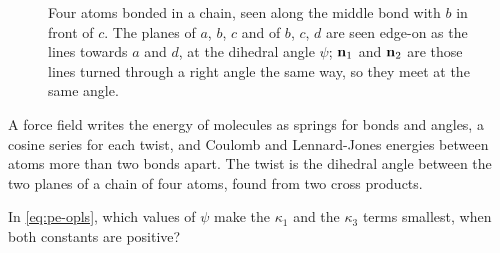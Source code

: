 \begin{figure}[htb]
\centering
{}
\caption{Four atoms bonded in a chain, seen along the middle bond with
$b$ in front of $c$. The planes of $a$, $b$, $c$ and of $b$, $c$, $d$ are
seen edge-on as the lines towards $a$ and $d$, at the dihedral angle
$\psi$; $\bm{\mathrm{n}}_1$ and $\bm{\mathrm{n}}_2$ are those lines turned through a right
angle the same way, so they meet at the same angle.}
\label{fig:pe-dihedral}
\end{figure}

\begin{keyidea}
A force field writes the energy of molecules as springs for bonds and
angles, a cosine series for each twist, and Coulomb and Lennard-Jones
energies between atoms more than two bonds apart. The twist is the
dihedral angle between the two planes of a chain of four atoms, found
from two cross products.
\end{keyidea}


\begin{selfcheck}
In \cref{eq:pe-opls}, which values of $\psi$ make the $\kappa_1$ and the
$\kappa_3$ terms smallest, when both constants are positive?
\end{selfcheck}
